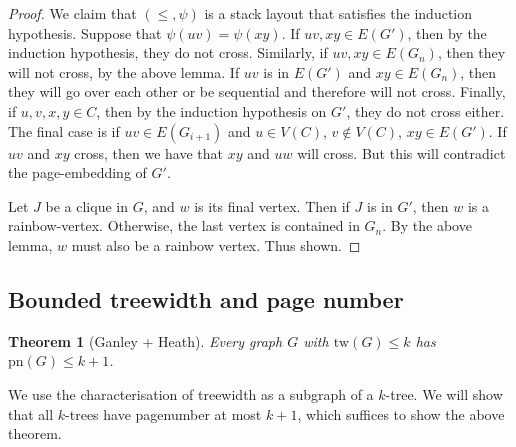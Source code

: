 \documentclass[]{article}
\newcommand{\tw}{\text{tw}}
\newcommand{\pn}{\text{pn}}
\newtheorem{theorem}{Theorem}
\theoremstyle{definition}
\numberwithin{theorem}{section}
\numberwithin{equation}{section}
\begin{document}
\begin{proof}
	We claim that $(\leq , \psi)$ is a stack layout that satisfies the induction hypothesis. Suppose that $\psi(uv) = \psi(xy)$. If $uv, xy \in E(G')$, then by the induction hypothesis, they do not cross. Similarly, if $uv, xy \in E(G_n)$, then they will not cross, by the above lemma. If $uv$ is in $E(G')$ and $xy \in E(G_n)$, then they will go over each other or be sequential and therefore will not cross. 
	Finally, if $u, v, x, y \in C$, then by the induction hypothesis on $G'$, they do not cross either. The final case is if $uv \in E(G_{i + 1})$ and $u \in V(C)$, $v \notin V(C)$, $xy \in E(G')$. If $uv$ and $xy$ cross, then we have that $xy$ and $uw$ will cross. But this will contradict the page-embedding of $G'$.
	
	Let $J$ be a clique in $G$, and $w$ is its final vertex. Then if $J$ is in $G'$, then $w$ is a rainbow-vertex. Otherwise, the last vertex is contained in $G_n$. By the above lemma, $w$ must also be a rainbow vertex. Thus shown.
\end{proof}


\subsection{Bounded treewidth and page number}\label{ssec:Bounded_Treewidth}
\begin{theorem}[Ganley + Heath\cite{ganleyPagenumberTrees2001}]\label{thm:bded_treewidth_bded_pagenumber}
	Every graph $G$ with $\tw(G) \leq k$ has $\pn(G) \leq k + 1$. 
\end{theorem}

We use the characterisation of treewidth as a subgraph of a $k$-tree. We will show that all $k$-trees have pagenumber at most $k + 1$, which suffices to show the above theorem.
\end{document}
